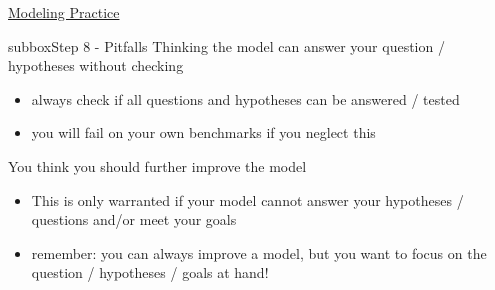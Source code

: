 \begin{textbox}{\href{https://compneuro.neuromatch.io/projects/modelingsteps/ModelingSteps_5through10.html}{Modeling Practice  } }
\begin{subbox}{subbox}{Step 8 - Pitfalls }
Thinking the model can answer your question / hypotheses without checking
\begin{itemize}
    \item always check if all questions and hypotheses can be answered / tested
   \item you will fail on your own benchmarks if you neglect this\end{itemize}
  

You think you should further improve the model
\begin{itemize}
    \item This is only warranted if your model cannot answer your hypotheses / questions and/or meet your goals
   \item remember: you can always improve a model, but you want to focus on the question / hypotheses / goals at hand!\end{itemize}
  
\end{subbox}
 
 
\end{textbox}

